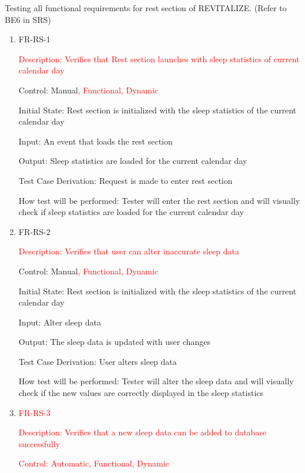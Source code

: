 \documentclass[12pt, titlepage]{article}
\begin{document}
Testing all functional requirements for rest section of REVITALIZE. (Refer to BE6 in SRS)

\begin{enumerate}
	
	\item{FR-RS-1\\}
 
        \textcolor{red}{Description: Verifies that Rest section launches with sleep statistics of current calendar day}
	
	Control: Manual\textcolor{red}{, Functional, Dynamic}
	
	Initial State: Rest section is initialized with the sleep statistics of the current calendar day
	
	Input: An event that loads the rest section
	
	Output: Sleep statistics are loaded for the current calendar day
	
	Test Case Derivation: Request is made to enter rest section
	
	How test will be performed: Tester will enter the rest section and will visually check if sleep statistics are loaded for the current calendar day
	
	\item{FR-RS-2 \\}

        \textcolor{red}{Description: Verifies that user can alter inaccurate sleep data}
	
	Control: Manual\textcolor{red}{, Functional, Dynamic}
	
	Initial State: Rest section is initialized with the sleep statistics of the current calendar day
	
	Input: Alter sleep data
	
	Output: The sleep data is updated with user changes
	
	Test Case Derivation: User alters sleep data
	
	How test will be performed: Tester will alter the sleep data and will visually check if the new values are correctly displayed in the sleep statistics

   \item{\textcolor{red}{FR-RS-3\\}}

 \textcolor{red}{Description: Verifies that a new sleep data can be added to database successfully}
	
	\textcolor{red}{Control: Automatic, Functional, Dynamic}
	

\end{enumerate}
\end{document}
